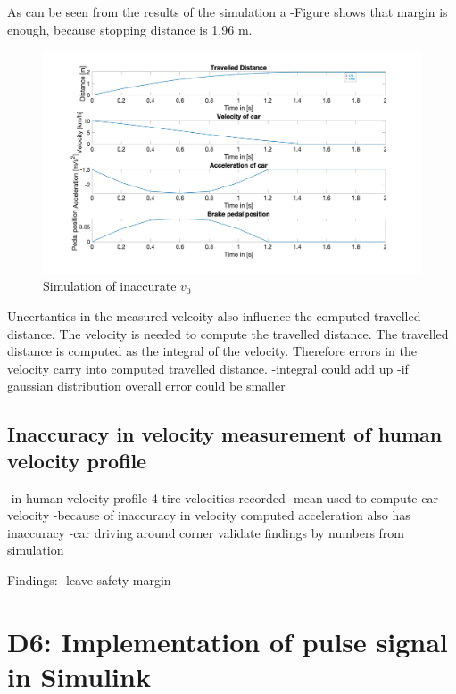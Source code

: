 As can be seen from the results of the simulation a 
-Figure shows that margin is enough, because stopping distance is 1.96 m.

\begin{figure}[H]
\centering
\includegraphics[width=1\textwidth]{images/D5_result.jpg}
\caption{Simulation of inaccurate $v_0$}
\label{fig:D5_restuls}
\end{figure}




Uncertanties in the measured velcoity also influence the computed travelled distance.
The velocity is needed to compute the travelled distance. The travelled distance is computed as the integral of the velocity. Therefore errors in the velocity carry into computed travelled distance.
-integral could add up
-if gaussian distribution overall error could be smaller

\section{Inaccuracy in velocity measurement of human velocity profile}

-in human velocity profile 4 tire velocities recorded
-mean used to compute car velocity
-because of inaccuracy in velocity computed acceleration also has inaccuracy
-car driving around corner
validate findings by numbers from simulation

Findings:
-leave safety margin

\chapter{D6: Implementation of pulse signal in Simulink}\label{cha:D6}

